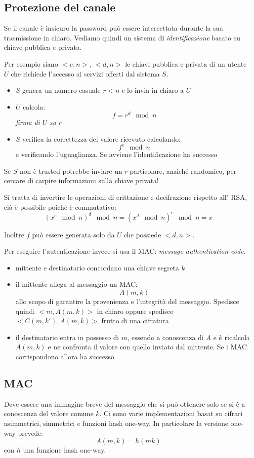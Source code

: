 \subsection{Protezione del canale}
Se il canale è insicuro la password può essere intercettata durante la sua trasmissione in chiaro.
Vediamo quindi un sistema di \emph{identificazione} basato su chiave pubblica e privata.

Per esempio siano $<e,n>$, $<d,n>$ le chiavi pubblica e privata di un utente $U$ che richiede l'accesso ai servizi offerti dal sistema $S$.
\begin{itemize}
    \item $S$ genera un numero casuale $r < n$ e lo invia in chiaro a $U$
    \item $U$ calcola:
    $$ f = r^d \mod n $$
    \emph{firma di $U$ su $r$}
    \item $S$ verifica la correttezza del valore ricevuto calcolando:
    $$ f^e \mod n $$
    e verificando l'uguaglianza. Se avviene l'identificazione ha successo
\end{itemize}

Se $S$ non è trusted potrebbe inviare un $r$ particolare, anziché randomico, per cercare di carpire informazioni sulla chiave privata!

Si tratta di invertire le operazioni di crittazione e decifrazione rispetto all' RSA, ciò è possibile poiché è commutativo:
$$ (x^e \mod n)^d \mod n = (x^d \mod n)^e \mod n = x $$

Inoltre $f$ può essere generata solo da $U$ che possiede $<d, n>$.

Per eseguire l'autenticazione invece si usa il MAC: \emph{message authentication code}.
\begin{itemize}
    \item mittente e destinatario concordano una chiave segreta $k$
    \item il mittente allega al messaggio un MAC:
    $$ A(m,k) $$
    allo scopo di garantire la provenienza e l'integrità del messaggio.
    Spedisce quindi $<m, A(m,k)>$ in chiaro oppure spedisce $<C(m,k'),A(m,k)>$ frutto di una cifratura
    \item il destinatario entra in possesso di $m$, essendo a conoscenza di $A$ e $k$ ricalcola $A(m,k)$ e ne confronta il valore con quello inviato dal mittente. Se i MAC corrispondono allora ha successo
\end{itemize}

\subsection{MAC}
Deve essere una immagine breve del messaggio che si può ottenere solo se si è a conoscenza del valore comune $k$.
Ci sono varie implementazioni basat su cifrari asimmetrici, simmetrici e funzioni hash one-way.
In particolare la versione one-way prevede:
$$ A(m,k) = h(mk) $$
con $h$ una funzione hash one-way.

